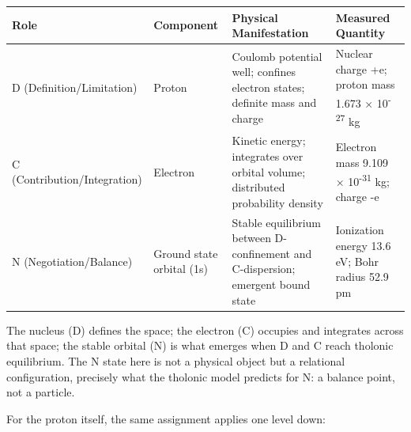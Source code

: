 \documentclass[
  11pt,
  letterpaper,
]{article}
\begin{document}
\begin{longtable}[]{@{}
  >{\raggedright\arraybackslash}p{}
  >{\raggedright\arraybackslash}p{}
  >{\raggedright\arraybackslash}p{}
  >{\raggedright\arraybackslash}p{}@{}}
\toprule\noalign{}
\begin{minipage}[b]{\linewidth}\raggedright
Role
\end{minipage} & \begin{minipage}[b]{\linewidth}\raggedright
Component
\end{minipage} & \begin{minipage}[b]{\linewidth}\raggedright
Physical Manifestation
\end{minipage} & \begin{minipage}[b]{\linewidth}\raggedright
Measured Quantity
\end{minipage} \\
\midrule\noalign{}
\endhead
\bottomrule\noalign{}
\endlastfoot
D (Definition/Limitation) & Proton & Coulomb potential well; confines
electron states; definite mass and charge & Nuclear charge +e; proton
mass 1.673 × 10\textsuperscript{-27} kg \\
C (Contribution/Integration) & Electron & Kinetic energy; integrates
over orbital volume; distributed probability density & Electron mass
9.109 × 10\textsuperscript{-31} kg; charge -e \\
N (Negotiation/Balance) & Ground state orbital (1s) & Stable equilibrium
between D-confinement and C-dispersion; emergent bound state &
Ionization energy 13.6 eV; Bohr radius 52.9 pm \\
\end{longtable}

The nucleus (D) defines the space; the electron (C) occupies and
integrates across that space; the stable orbital (N) is what emerges
when D and C reach tholonic equilibrium. The N state here is not a
physical object but a relational configuration, precisely what the
tholonic model predicts for N: a balance point, not a particle.

For the proton itself, the same assignment applies one level down:
\end{document}
